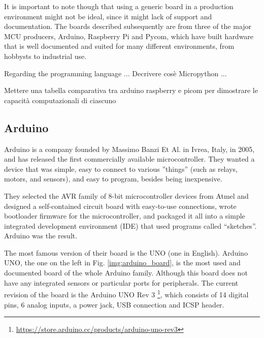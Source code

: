 	It is important to note though that using a generic board in a production environment might not be ideal, since it might lack of support and documentation.
	The boards described subsequently are from three of the major MCU producers, Arduino, Raspberry Pi and Pycom, which have built hardware that is well documented and suited for many different environments, from hobbysts to industrial use.
	
	Regarding the programming language ... Decrivere cosè Micropython ... 
	
	Mettere una tabella comparativa tra arduino raspberry e picom per dimostrare le capacità computazionali di ciascuno

	\subsection{Arduino}
	
		Arduino is a company founded by Massimo Banzi Et Al. in Ivrea, Italy, in 2005, and has released the first commercially available microcontroller.
		They wanted a device that was simple, easy to connect to various ''things'' (such as relays, motors, and sensors), and easy to program, besides being inexpensive.
	
		They selected the AVR family of 8-bit microcontroller devices from Atmel and designed a self-contained circuit board with easy-to-use connections, wrote bootloader firmware for the microcontroller, and packaged it all into a simple integrated development environment (IDE) that used programs called “sketches”. 
		Arduino was the result.
		
		The most famous version of their board is the UNO (one in English).
		Arduino UNO, the one on the left in Fig. \ref{img:arduino_board}, is the most used and documented board of the whole Arduino family.
		Although this board does not have any integrated sensors or particular ports for peripherals.
		The current revision of the board is the Arduino UNO Rev 3 \footnote{\url{https://store.arduino.cc/products/arduino-uno-rev3}}, which consists of 14 digital pins, 6 analog inputs, a power jack, USB connection and ICSP header.
		
